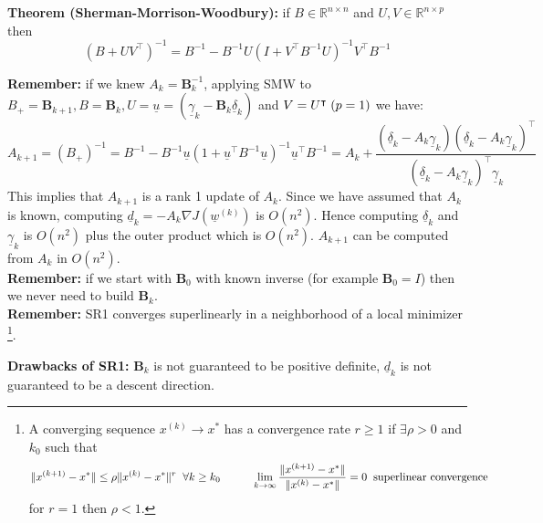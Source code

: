 \textbf{Theorem (Sherman-Morrison-Woodbury): } if $B \in \mathbb{R}^{n\times n}$ and $U,V \in \mathbb{R}^{n \times p}$ then 
\[
    (B + UV^\intercal)^{-1} = B^{-1} - B^{-1}U(I + V^\intercal B^{-1}U)^{-1}V^\intercal B^{-1}    
\]

\textbf{Remember: } if we knew $A_k = \mathbf{B}_k^{-1}$, applying SMW to $B_{+} = \mathbf{B}_{k+1}, B = \mathbf{B}_k, U = \underline{u} = (\underline{\gamma}_k - \mathbf{B}_k\underline{\delta}_k)$ and $V = U^\intercal \hspace{0.1cm}(p=1)$ we have:
\[
    A_{k+1} = (B_+)^{-1} = B^{-1} - B^{-1}\underline{u}(1+\underline{u}^\intercal B^{-1}\underline{u})^{-1}\underline{u}^\intercal B^{-1} = A_k + \dfrac{(\underline{\delta}_k - A_k\underline{\gamma}_k)(\underline{\delta}_k - A_k\underline{\gamma}_k)^\intercal}{(\underline{\delta}_k - A_k\underline{\gamma}_k)^\intercal \underline{\gamma}_k}
\] 
This implies that $A_{k+1}$ is a rank 1 update of $A_k$. Since we have assumed that $A_k$ is known, computing $\underline{d}_k = -A_k \nabla J(\underline{w}^{(k)})$ is $O(n^2)$. Hence computing $\underline{\delta}_k$ and $\underline{\gamma}_k$ is $O(n^2)$ plus the outer product which is $O(n^2)$. $A_{k+1}$ can be computed from $A_k$ in $O(n^2)$. \\

\textbf{Remember: } if we start with $\mathbf{B}_0$ with known inverse (for example $\mathbf{B}_0 = I$) then we never need to build $\mathbf{B}_k$. \\

\textbf{Remember: } SR1 converges superlinearly in a neighborhood of a local minimizer \footnote[2]{A converging sequence $x^{(k)} \to x^*$ has a convergence rate $r\geq 1$ if $\exists \rho > 0$ and $k_0$ such that 
\[
    \|x^{(k+1)} - x^*\| \leq \rho \|x^{(k)} - x^*\|^r \hspace{0.2cm} \forall k \geq k_0 \hspace{1cm} \lim_{k \to \infty} \frac{\|x^{(k+1)} - x^*\|}{\|x^{(k)} - x^*\|} = 0 \hspace{0.2cm} \text{superlinear convergence}
\]
for $r = 1$ then $\rho < 1.$
}.

\textbf{Drawbacks of SR1:} $\mathbf{B}_k$ is not guaranteed to be positive definite, $\underline{d}_k$ is not guaranteed to be a descent direction.\\


